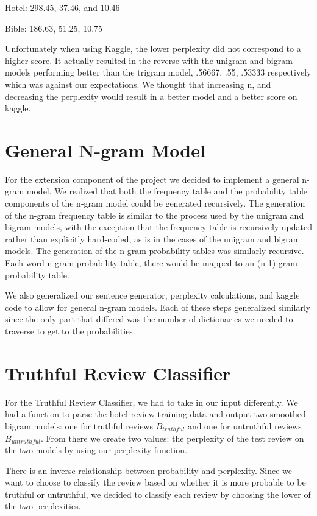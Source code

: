 \documentclass[11pt]{article}
\begin{document}
Hotel: 298.45, 37.46, and 10.46

Bible: 186.63, 51.25, 10.75

Unfortunately when using Kaggle, the lower perplexity did not correspond to a higher score. It actually resulted in the reverse with the unigram and bigram models performing better than the trigram model, .56667, .55, .53333 respectively which was against our expectations. We thought that increasing n, and decreasing the perplexity would result in a better model and a better score on kaggle.

\section{General N-gram Model}
For the extension component of the project we decided to implement a general n-gram model. We realized that both the frequency table and the probability table components of the n-gram model could be generated recursively. The generation of the n-gram frequency table is similar to the process used by the unigram and bigram models, with the exception that the frequency table is recursively updated rather than explicitly hard-coded, as is in the cases of the unigram and bigram models. The generation of the n-gram probability tables was similarly recursive. Each word n-gram probability table, there would be mapped to an (n-1)-gram probability table. 

We also generalized our sentence generator, perplexity calculations, and kaggle code to allow for general n-gram models. Each of these steps generalized similarly since the only part that differed was the number of dictionaries we needed to traverse to get to the probabilities.

\section{Truthful Review Classifier}
For the Truthful Review Classifier, we had to take in our input differently. We had a function to parse the hotel review training data and output two smoothed bigram models: one for truthful reviews $B_{truthful}$ and one for untruthful reviews $B_{untruthful}$. From there we create two values: the perplexity of the test review on the two models by using our perplexity function. 

There is an inverse relationship between probability and perplexity. Since we want to choose to classify the review based on whether it is more probable to be truthful or untruthful, we decided to classify each review by choosing the lower of the two perplexities.
\end{document}
